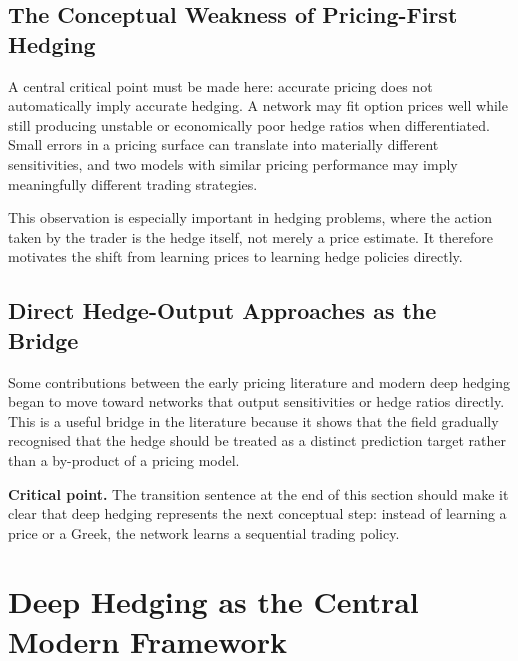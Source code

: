 \documentclass[12pt, a4paper]{article}
\newcommand{\crit}[1]{\noindent\textbf{Critical point.} #1}
\begin{document}
\subsection{The Conceptual Weakness of Pricing-First Hedging}
\label{subsec:pricing_limits}

A central critical point must be made here: accurate pricing does not automatically
imply accurate hedging. A network may fit option prices well while still producing
unstable or economically poor hedge ratios when differentiated. Small errors in a
pricing surface can translate into materially different sensitivities, and two models
with similar pricing performance may imply meaningfully different trading strategies.

This observation is especially important in hedging problems, where the action taken
by the trader is the hedge itself, not merely a price estimate. It therefore motivates
the shift from learning prices to learning hedge policies directly.


\subsection{Direct Hedge-Output Approaches as the Bridge}
\label{subsec:direct_output}

Some contributions between the early pricing literature and modern deep hedging began
to move toward networks that output sensitivities or hedge ratios directly. This is a
useful bridge in the literature because it shows that the field gradually recognised
that the hedge should be treated as a distinct prediction target rather than a
by-product of a pricing model.

\crit{The transition sentence at the end of this section should make it clear that
deep hedging represents the next conceptual step: instead of learning a price or a
Greek, the network learns a sequential trading policy.}

\section{Deep Hedging as the Central Modern Framework}
\label{sec:deep_hedging}
\end{document}
